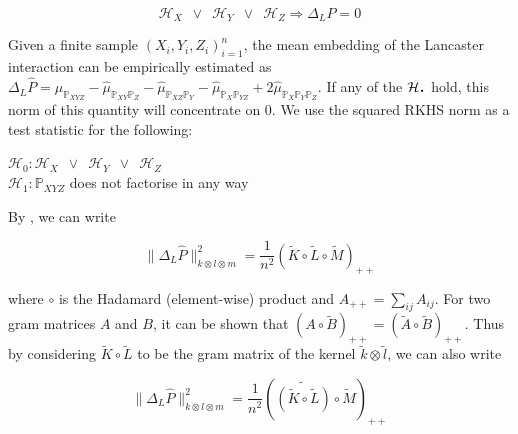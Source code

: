 \documentclass[]{article}
\newcommand*{\LargerCdot}{\raisebox{-0.25ex}{\scalebox{1.5}{$\cdot$}}}
\begin{document}
\[\mathcal{H}_X \enspace \lor \enspace \mathcal{H}_Y \enspace \lor \enspace \mathcal{H}_Z \Rightarrow \Delta_LP=0 \]

Given a finite sample $(X_i,Y_i,Z_i)_{i=1}^n$, the mean embedding of the Lancaster interaction can be empirically estimated as $\Delta_L\hat{P} = \hat{\mu}_{\mathbb{P}_{XYZ}} - \hat{\mu}_{\mathbb{P}_{XY}\mathbb{P}_{Z}} - \hat{\mu}_{\mathbb{P}_{XZ}\mathbb{P}_{Y}} - \hat{\mu}_{\mathbb{P}_{X}\mathbb{P}_{YZ}} + 2\hat{\mu}_{\mathbb{P}_{X}\mathbb{P}_{Y}\mathbb{P}_{Z}}$. If any of the $\mathcal{H}_{\LargerCdot}$ hold, this norm of this quantity will concentrate on 0. We use the squared RKHS norm as a test statistic for the following:

$\mathcal{H}_0: \mathcal{H}_X \enspace \lor \enspace \mathcal{H}_Y \enspace \lor \enspace \mathcal{H}_Z $\\
$\mathcal{H}_1: \mathbb{P}_{XYZ}$ does not factorise in any way

By \cite{sejdinovic2013kernel}, we can write  

\begin{equation}\label{eqn:lancaster}
\|\Delta_L\hat{P}\|_{k\otimes l \otimes m}^2 = \frac{1}{n^2}\left(\tilde{K}\circ\tilde{L}\circ\tilde{M}\right)_{++}
\end{equation}





where $\circ$ is the Hadamard (element-wise) product and $A_{++} = \sum_{ij}A_{ij}$. For two gram matrices $A$ and $B$, it can be shown that $\left(A\circ\tilde{B}\right)_{++} = \left(\tilde{A}\circ\tilde{B}\right)_{++}$. Thus by considering $\tilde{K}\circ \tilde{L}$ to be the gram matrix of the kernel $\tilde{k}\otimes\tilde{l}$, we can also write

\begin{equation}\label{eqn:lancaster2}
\|\Delta_L\hat{P}\|_{k\otimes l \otimes m}^2 = \frac{1}{n^2}\left(\widetilde{(\tilde{K}\circ\tilde{L})}\circ\tilde{M}\right)_{++}
\end{equation}
\end{document}
